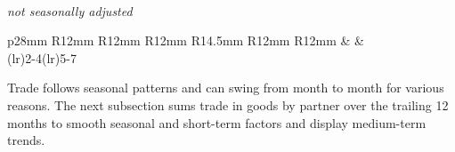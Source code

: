 \\
\footnotesize{\textit{not seasonally adjusted}}
\vspace*{-7mm}

 \setlength{\tabcolsep}{3.5pt} \color{black!90}
	{\renewcommand{\arraystretch}{1.55}
	\begin{tabular}{p{28mm} R{12mm} R{12mm} R{12mm} R{14.5mm} R{12mm} R{12mm}}
			&  &  \\
		\addlinespace[-0.5mm]\cmidrule(lr){2-4}\cmidrule(lr){5-7}
		  \addlinespace[-0.5mm]
			  \hline
		\end{tabular}}\vspace{-1.5mm}
		
\begin{minipage}{0.76\textwidth}
\vspace{0.5mm}

\small 

Trade follows seasonal patterns and can swing from month to month for various reasons. The next subsection sums trade in goods by partner over the trailing 12 months to smooth seasonal and short-term factors and display medium-term trends.
\end{minipage}
\newpage
{} 

